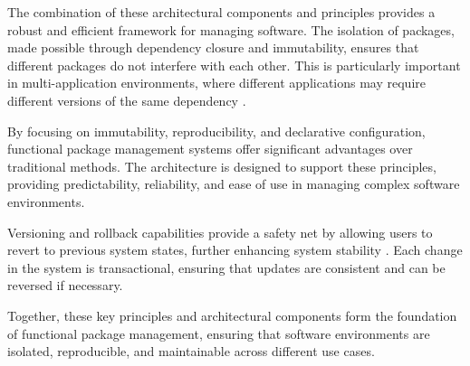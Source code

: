 The combination of these architectural components and principles provides a robust and efficient
framework for managing software. The isolation of packages, made possible through dependency
closure and immutability, ensures that different packages do not interfere with each other. This
is particularly important in multi-application environments, where different applications may
require different versions of the same dependency \cite[Chapter 2.1]{dolstraPurelyFunctionalSoftware2006}.

By focusing on immutability, reproducibility, and declarative configuration, functional package
management systems offer significant advantages over traditional methods. The architecture is
designed to support these principles, providing predictability, reliability, and ease of use in
managing complex software environments.

Versioning and rollback capabilities provide a safety net by allowing users to revert to previous
system states, further enhancing system stability \cite[Chapter 1.5]{dolstraPurelyFunctionalSoftware2006}.
Each change in the system is transactional, ensuring that updates are consistent and can be reversed
if necessary.

Together, these key principles and architectural components form the foundation of functional
package management, ensuring that software environments are isolated, reproducible, and maintainable
across different use cases.
